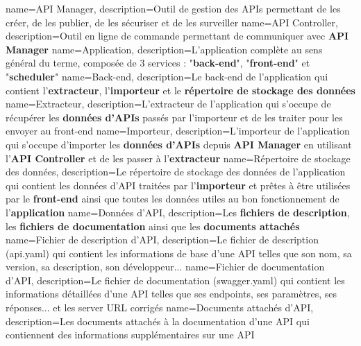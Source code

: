 {
    name=API Manager,
    description={Outil de gestion des APIs permettant de les créer, de les publier, de les sécuriser et de les surveiller}
}
{
    name=API Controller,
    description={Outil en ligne de commande permettant de communiquer avec \textbf{API Manager}}
}
{
    name=Application,
    description={L'application complète au sens général du terme, composée de 3 services : "\textbf{back-end}", "\textbf{front-end}" et "\textbf{scheduler}"}
}
{
    name=Back-end,
    description={Le back-end de l'application qui contient l'\textbf{extracteur}, l'\textbf{importeur} et le \textbf{répertoire de stockage des données}}
}
{
    name=Extracteur,
    description={L'extracteur de l'application qui s'occupe de récupérer les \textbf{données d'APIs} passés par l'importeur et de les traiter pour les envoyer au front-end}
}
{
    name=Importeur,
    description={L'importeur de l'application qui s'occupe d'importer les \textbf{données d'APIs} depuis \textbf{API Manager} en utilisant l'\textbf{API Controller} et de les passer à l'\textbf{extracteur}}
}
{
    name=Répertoire de stockage des données,
    description={Le répertoire de stockage des données de l'application qui contient les données d'API traitées par l'\textbf{importeur} et prêtes à être utilisées par le \textbf{front-end} ainsi que toutes les données utiles au bon fonctionnement de l'\textbf{application}}
}
{
    name=Données d'API,
    description={Les \textbf{fichiers de description}, les \textbf{fichiers de documentation} ainsi que les \textbf{documents attachés}}
}
{
    name=Fichier de description d'API,
    description={Le fichier de description (api.yaml) qui contient les informations de base d'une API telles que son nom, sa version, sa description, son développeur...}
}
{
    name=Fichier de documentation d'API,
    description={Le fichier de documentation (swagger.yaml) qui contient les informations détaillées d'une API telles que ses endpoints, ses paramètres, ses réponses... et les server URL corrigés}
}
{
    name=Documents attachés d'API,
    description={Les documents attachés à la documentation d'une API qui contiennent des informations supplémentaires sur une API}
}
